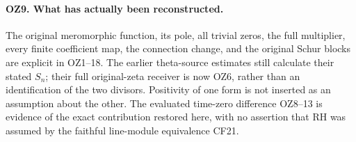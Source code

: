 \paragraph{OZ9. What has actually been reconstructed.}
The original meromorphic function, its pole, all trivial zeros,
the full multiplier, every finite coefficient map, the connection
change, and the original Schur blocks are explicit in OZ1--18.
The earlier theta-source estimates still calculate their stated
\(S_n\); their full original-zeta receiver is now OZ6, rather
than an identification of the two divisors. Positivity of one
form is not inserted as an assumption about the other. The
evaluated time-zero difference OZ8--13 is evidence of the exact
contribution restored here, with no assertion that RH was assumed
by the faithful line-module equivalence CF21.
